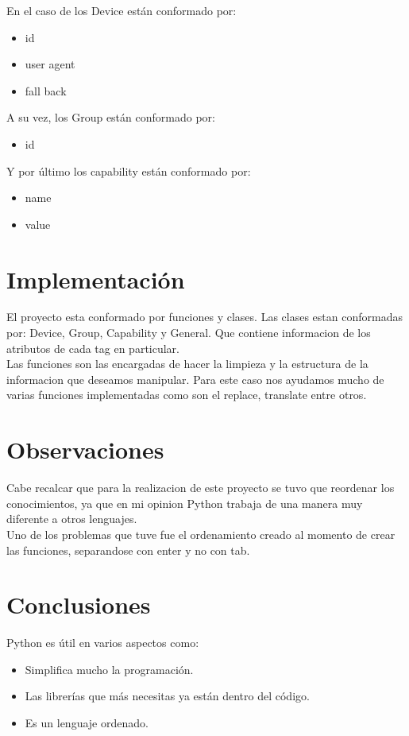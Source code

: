 \documentclass[12pt]{book} %
\begin{document}
En el caso de los Device est\'an conformado por: 
\begin{itemize}
  \item id
  \item user agent
  \item fall back
\end{itemize}

A su vez, los Group est\'an conformado por: 
\begin{itemize}
  \item id
\end{itemize}

Y por \'ultimo los capability est\'an conformado por: 
\begin{itemize}
  \item name
  \item value
\end{itemize}


\chapter{Implementaci\'on}
El proyecto esta conformado por funciones y clases. Las clases estan conformadas por: Device, Group, Capability y General. Que contiene informacion de los atributos de cada tag en particular.~\\[0.5cm]
Las funciones son las encargadas de hacer la limpieza y la estructura de la informacion que deseamos manipular. Para este caso nos ayudamos mucho de varias funciones implementadas como son el replace, translate entre otros.~\\[0.5cm]


\chapter{Observaciones}
Cabe recalcar que para la realizacion de este proyecto se tuvo que reordenar los conocimientos, ya que en mi opinion Python trabaja de una manera muy diferente a otros lenguajes.~\\[0.5cm]
Uno de los problemas que tuve fue el ordenamiento creado al momento de crear las funciones, separandose con enter y no con tab.
\chapter{Conclusiones}
Python es \'util en varios aspectos como: 
\begin{itemize}
  \item Simplifica mucho la programación.
  \item Las librerías que más necesitas ya están dentro del código.
  \item Es un lenguaje ordenado.
\end{itemize}
\end{document}
